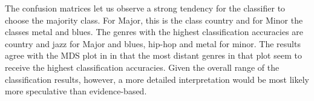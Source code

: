 \documentclass{article}
\begin{document}
The confusion matrices let us observe a strong tendency for the classifier to choose the majority class. For Major, this is the class country and for Minor the classes metal and blues. 
The genres with the highest classification  accuracies are country and jazz for Major and blues, hip-hop and metal for minor. 
The results agree with the MDS plot in  in that the most distant genres in that plot seem to receive the highest classification accuracies. Given the overall range of the classification results, however, a more detailed interpretation would be most likely more speculative than evidence-based.

\begin{table}
\begin{center}
    \caption{Confusion matrix, Major keys}
    \label{tab:confMatMajPC}
  \end{center}
\end{table}
\end{document}
